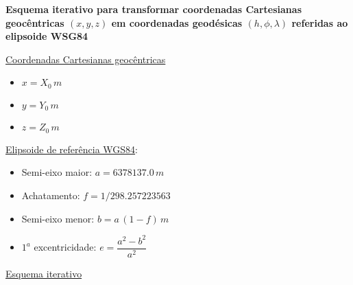 \documentclass[10pt,a4paper]{article}
\author{Vanderlei C. Oliveira Jr.}
\begin{document}
\begin{center}
\begin{large}
\textbf{Esquema iterativo para transformar coordenadas Cartesianas 
geocêntricas $(x,y,z)$ em coordenadas geodésicas $(h,\phi,\lambda)$
referidas ao elipsoide WSG84}
\end{large}
\end{center}

\bigskip
\bigskip

\underline{Coordenadas Cartesianas geocêntricas}

\begin{itemize}
\item $x = X_{0} \, m$ 
\item $y = Y_{0} \, m$
\item $z = Z_{0} \, m$
\end{itemize}

\bigskip

\underline{Elipsoide de refer\^{e}ncia WGS84}:

\begin{itemize}
\item Semi-eixo maior: $a = 6378137.0 \, m$
\item Achatamento: $f = 1/298.257223563$
\item Semi-eixo menor: $b = a \, (1 - f) \, m$
\item $1^{a}$ excentricidade: $e = \dfrac{a^{2} - b^{2}}{a^{2}}$
\end{itemize}

\bigskip

\underline{Esquema iterativo}
\end{document}
